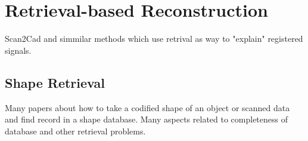 \section{Retrieval-based Reconstruction}
\label{sec:retrieval_reconstruction}

Scan2Cad and simmilar methods which use retrival as way to "explain" registered signals.

\subsection{Shape Retrieval}
\label{sec:shape_retrieval}

Many papers about how to take a codified shape of an object or scanned data and find record in a shape database. Many aspects related to completeness of database and other retrieval problems.
